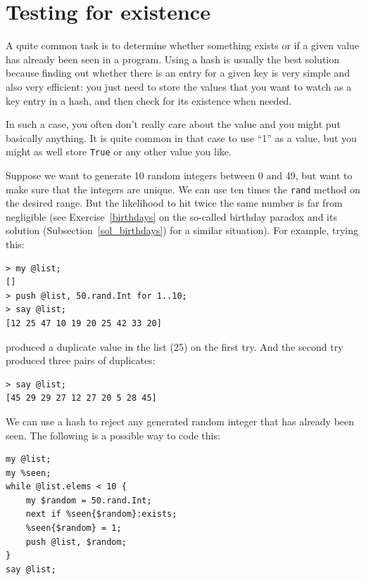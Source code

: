 \section{Testing for existence}

A quite common task is to determine whether something exists or 
if a given value has already been seen in a program. Using a 
hash is usually the best solution because finding out whether 
there is an entry for a given key is very simple and also 
very efficient: you just need to store the values that you 
want to watch as a key entry in a hash, and then check for 
its existence when needed.

In such a case, you often don't really 
care about the value and you might put basically anything. 
It is quite common in that case to use ``1'' as a value, but 
you might as well store {\tt True} or any other value you 
like.

Suppose we want to generate 10 random integers between 0 and 
49, but want to make sure that the integers are unique. We 
can use ten times the {\tt rand} method on the desired range. But 
the likelihood to hit twice the same number is far from 
negligible (see Exercise~\ref{birthdays} on the so-called 
birthday paradox and its solution (Subsection~\ref{sol_birthdays}) 
for a similar situation). For example, trying this:

\begin{verbatim}
> my @list;
[]
> push @list, 50.rand.Int for 1..10;
> say @list;
[12 25 47 10 19 20 25 42 33 20]
\end{verbatim}

produced a duplicate value in the list (25) on the first try.
And the second try produced three pairs of duplicates:

\begin{verbatim}
> say @list;
[45 29 29 27 12 27 20 5 28 45]
\end{verbatim}

We can use a hash to reject any generated random integer 
that has already been seen. The following is a possible way to 
code this:

\begin{verbatim}
my @list;
my %seen;
while @list.elems < 10 {
    my $random = 50.rand.Int;
    next if %seen{$random}:exists;
    %seen{$random} = 1;
    push @list, $random;
}
say @list;
\end{verbatim}

